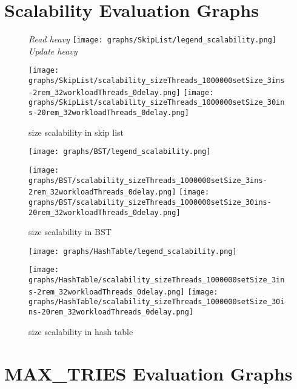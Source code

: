 \documentclass{article}
\begin{document}
\newpage
\section{Scalability Evaluation Graphs}
\begin{figure*}[htbp]
    \centering
    \medskip
    \textit{Read heavy}\quad\quad
    \texttt{[image: graphs/SkipList/legend\_scalability.png]}\quad\quad
    \textit{Update heavy}\par
    \medskip
    \texttt{[image: graphs/SkipList/scalability\_sizeThreads\_1000000setSize\_3ins-2rem\_32workloadThreads\_0delay.png]}\hspace{2.5em}
    \texttt{[image: graphs/SkipList/scalability\_sizeThreads\_1000000setSize\_30ins-20rem\_32workloadThreads\_0delay.png]}\vspace{-1.2em}
    \caption{size scalability in skip list}
    \label{fig:size scalability SL}
    \medskip
    \medskip
    \medskip
    \texttt{[image: graphs/BST/legend\_scalability.png]}\par
    \texttt{[image: graphs/BST/scalability\_sizeThreads\_1000000setSize\_3ins-2rem\_32workloadThreads\_0delay.png]}\hspace{2.5em}
    \texttt{[image: graphs/BST/scalability\_sizeThreads\_1000000setSize\_30ins-20rem\_32workloadThreads\_0delay.png]}\vspace{-1.2em}
    \caption{size scalability in BST}
    \label{fig:size scalability BST}
    \medskip
    \medskip
    \medskip
    \texttt{[image: graphs/HashTable/legend\_scalability.png]}\par
    \texttt{[image: graphs/HashTable/scalability\_sizeThreads\_1000000setSize\_3ins-2rem\_32workloadThreads\_0delay.png]}\hspace{2.5em}
    \texttt{[image: graphs/HashTable/scalability\_sizeThreads\_1000000setSize\_30ins-20rem\_32workloadThreads\_0delay.png]}\vspace{-1.2em}
    \caption{size scalability in hash table}
    \label{fig:size scalability HT}
\end{figure*}

\newpage
\section{MAX\_TRIES Evaluation Graphs}
\end{document}
